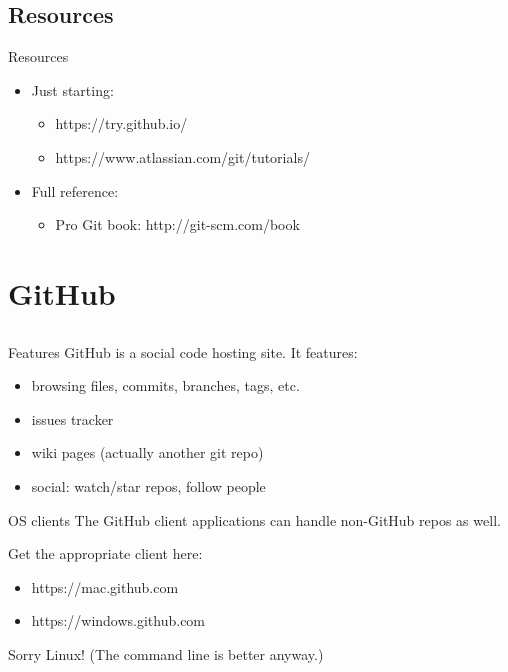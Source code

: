 \documentclass{beamer}
\begin{document}
\subsection{Resources}
\begin{frame}{Resources}
  \begin{itemize}
    \item Just starting:
      \begin{itemize}
        \item https://try.github.io/
        \item https://www.atlassian.com/git/tutorials/
      \end{itemize}
    \item Full reference:
      \begin{itemize}
        \item Pro Git book: http://git-scm.com/book
      \end{itemize}
  \end{itemize}
\end{frame}

\section{GitHub}
\subsection*{}

\begin{frame}{Features}
GitHub is a social code hosting site. It features:
  \begin{itemize}
    \item browsing files, commits, branches, tags, etc.
    \item issues tracker
    \item wiki pages (actually another git repo)
    \item social: watch/star repos, follow people
  \end{itemize}
\end{frame}

\begin{frame}{OS clients}
The GitHub client applications can handle non-GitHub repos as well.

\vspace{1em}

Get the appropriate client here:
  \begin{itemize}
    \item https://mac.github.com
    \item https://windows.github.com
  \end{itemize}
Sorry Linux! (The command line is better anyway.)
\end{frame}
\end{document}
